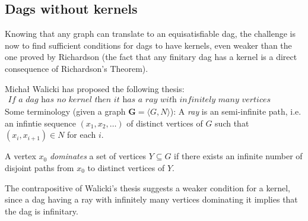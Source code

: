 
\subsection{Dags without kernels}
\label{sub:Dags without kernels}
Knowing that any graph can translate to an equisatisfiable dag, the challenge is now to find sufficient conditions for dags to have kernels, even weaker than the one proved by Richardson (the fact that any finitary dag has a kernel is a direct consequence of Richardson's Theorem).

Michał Walicki has proposed the following thesis:
\begin{align}
  \textit{If a dag has no kernel then it has a ray with infinitely many vertices dominating it.}
\end{align}
Some terminology (given a graph $\mathbf{G} = \langle G,N \rangle$):
A \textit{ray} is an semi-infinite path, i.e. an infintie sequence $(x_1, x_2, \dots)$ of distinct vertices of $G$ such that $(x_i,x_{i+1}) \in N$ for each $i$.

A vertex $x_0$ \textit{dominates} a set of vertices $Y \subseteq G$ if there exists an infinite number of disjoint paths from $x_0$ to distinct vertices of $Y$.

The contrapositive of Walicki's thesis suggests a weaker condition for a kernel, since a dag having a ray with infinitely many vertices dominating it implies that the dag is infinitary.
